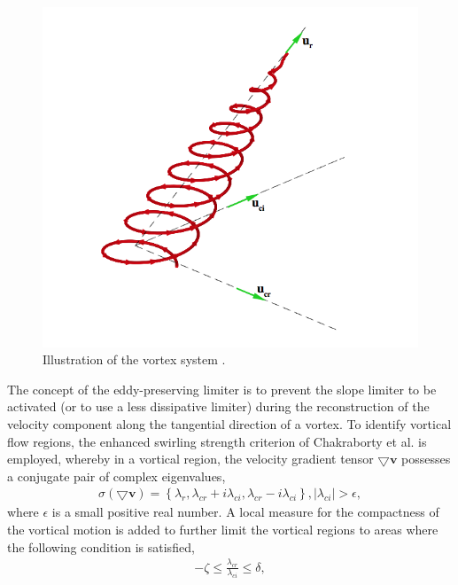 \begin{figure}[t]
\centering
   \includegraphics[clip=true, trim= 0.0cm 0.0cm 0.0cm 0.0cm,width=0.99\linewidth]{./figures/vorcord} 
\caption{Illustration of the vortex system \cite{mohamed2012eddy}.}
\end{figure}
The concept of the eddy-preserving limiter is to prevent the slope limiter to be activated (or to use a less dissipative limiter) during the reconstruction of the velocity component along the tangential direction of a vortex. To identify vortical flow regions, the enhanced swirling strength criterion of Chakraborty et al. \cite{chakraborty2005relationships} is employed, whereby in a vortical region, the velocity gradient tensor $\pmb\bigtriangledown\mathbf{v}$ possesses a conjugate pair of complex eigenvalues,
\begin{align} 
\sigma ( \pmb \bigtriangledown \mathbf{v})=  \left \{\lambda_{r}, \lambda_{cr}+i\lambda_{ci}, \lambda_{cr}-i\lambda_{ci} \right \}, \left |\lambda_{ci}\right | > \epsilon, \end{align}
where $\epsilon$ is a small positive real number. A local measure for the compactness of the vortical motion is added to further limit the vortical regions to areas where the following condition is satisfied,
\begin{align} 
-\zeta \leq \frac{\lambda_{cr}}{\lambda_{ci}}\leq \delta, \label{eq:1}
\end{align}
